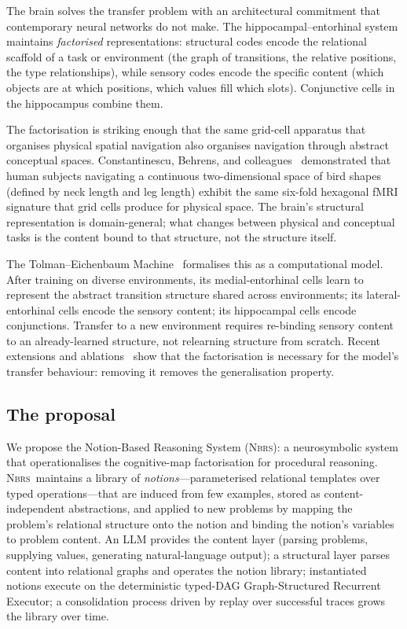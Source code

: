 \documentclass[11pt,a4paper]{article}
\theoremstyle{plain}
\theoremstyle{definition}
\theoremstyle{remark}
\newcommand{\NBRS}{\textsc{Nbrs}}
\begin{document}
The brain solves the transfer problem with an architectural commitment that contemporary neural networks do not make. The hippocampal--entorhinal system maintains \emph{factorised} representations: structural codes encode the relational scaffold of a task or environment (the graph of transitions, the relative positions, the type relationships), while sensory codes encode the specific content (which objects are at which positions, which values fill which slots). Conjunctive cells in the hippocampus combine them.

The factorisation is striking enough that the same grid-cell apparatus that organises physical spatial navigation also organises navigation through abstract conceptual spaces. Constantinescu, Behrens, and colleagues~\cite{constantinescu2016conceptual} demonstrated that human subjects navigating a continuous two-dimensional space of bird shapes (defined by neck length and leg length) exhibit the same six-fold hexagonal fMRI signature that grid cells produce for physical space. The brain's structural representation is domain-general; what changes between physical and conceptual tasks is the content bound to that structure, not the structure itself.

The Tolman--Eichenbaum Machine~\cite{whittington2020tem} formalises this as a computational model. After training on diverse environments, its medial-entorhinal cells learn to represent the abstract transition structure shared across environments; its lateral-entorhinal cells encode the sensory content; its hippocampal cells encode conjunctions. Transfer to a new environment requires re-binding sensory content to an already-learned structure, not relearning structure from scratch. Recent extensions and ablations~\cite{whittington2022disentanglement, spens2024consolidation} show that the factorisation is necessary for the model's transfer behaviour: removing it removes the generalisation property.

\subsection{The proposal}

We propose the Notion-Based Reasoning System (\NBRS): a neurosymbolic system that operationalises the cognitive-map factorisation for procedural reasoning. \NBRS\ maintains a library of \emph{notions}---parameterised relational templates over typed operations---that are induced from few examples, stored as content-independent abstractions, and applied to new problems by mapping the problem's relational structure onto the notion and binding the notion's variables to problem content. An LLM provides the content layer (parsing problems, supplying values, generating natural-language output); a structural layer parses content into relational graphs and operates the notion library; instantiated notions execute on the deterministic typed-DAG Graph-Structured Recurrent Executor; a consolidation process driven by replay over successful traces grows the library over time.
\end{document}
